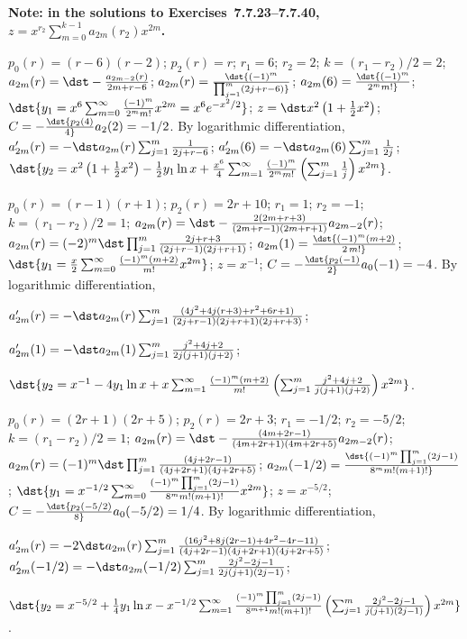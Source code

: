 \documentclass[dvips]{book}
\renewcommand{\exer}[1]{\par\medskip\;\noindent{\color{red}\bf #1.}}
\numberwithin{example}{section}
\numberwithin{equation}{section}
\numberwithin{theorem}{section}
\numberwithin{table}{section}
\numberwithin{figure}{section}
\begin{document}
{\bf Note: in the solutions to Exercises~7.7.23--7.7.40,
$z=x^{r_2}\sum_{m=0}^{k-1}a_{2m}(r_2)x^{2m}$.}




\exer{7.7.24}
$p_0(r)=(r-6)(r-2)$;
$p_2(r)=r$;
$r_1=6$; $r_2=2$; $k=(r_1-r_2)/2=2$;
$a_{2m}(r)=\dst-{a_{2m-2}(r)\over2m+r-6}
$;
 $a_{2m}(r)=\dst{(-1)^m\over\prod_{j=1}^m(2j+r-6)}$;
$a_{2m}(6)=\dst{(-1)^m\over2^mm!}$;
$\dst{y_1=x^6\sum_{m=0}^\infty{(-1)^m\over2^mm!}x^{2m}=x^6e^{-x^2/2}}$;
$z=\dst x^2\left(1+{1\over2}x^2\right)$;
$C=-\dst{p_2(4)\over4}a_2(2)=-1/2$.
By logarithmic differentiation,
$a_{2m}'(r)=-\dst a_{2m}(r)\sum_{j=1}^m{1\over2j+r-6}$;
$a_{2m}'(6)=-\dst a_{2m}(6)\sum_{j=1}^m{1\over2j}$;
$\dst{y_2=x^2\left(1+{1\over2}x^2\right)-{1\over2}y_1\ln
x+{x^6\over4}\sum_{m=1}^\infty{(-1)^m\over2^mm!}\left(\sum_{j=1}^m
{1\over j}\right)x^{2m}}$.


\exer{7.7.26}
$p_0(r)=(r-1)(r+1)$;
$p_2(r)=2r+10$;
$r_1=1$; $r_2=-1$; $k=(r_1-r_2)/2=1$;
$a_{2m}(r)=\dst-{2(2m+r+3)\over(2m+r-1)(2m+r+1)}a_{2m-2}(r)$;
 $a_{2m}(r)=(-2)^m\dst\prod_{j=1}^m{2j+r+3\over(2j+r-1)(2j+r+1)}$;
$a_{2m}(1)=\dst{(-1)^m(m+2)\over2\, m!}$;
$\dst{y_1={x\over2}\sum_{m=0}^\infty{(-1)^m(m+2)\over m!}x^{2m}}$;
$z=x^{-1}$;
$C=-\dst{p_2(-1)\over 2}a_0(-1)=-4$.
By logarithmic differentiation,

$a_{2m}'(r)=-\dst a_{2m}(r)\sum_{j=1}^m
{(4j^2+4j(r+3)+r^2+6r+1)\over(2j+r-1)(2j+r+1)(2j+r+3)}$;

$a_{2m}'(1)=-\dst a_{2m}(1)\sum_{j=1}^m{j^2+4j+2\over2j(j+1)(j+2)}$;

$\dst{y_2=x^{-1}-4y_1\ln x+x\sum_{m=1}^\infty{(-1)^m(m+2)\over
m!}\left(\sum_{j=1}^m{j^2+4j+2\over j(j+1)(j+2)} \right)x^{2m}}$.




\exer{7.7.28}
$p_0(r)=(2r+1)(2r+5)$;
$p_2(r)=2r+3$;
$r_1=-1/2$; $r_2=-5/2$; $k=(r_1-r_2)/2=1$;
$a_{2m}(r)=\dst-{(4m+2r-1)\over(4m+2r+1)(4m+2r+5)}a_{2m-2}(r)$;
$a_{2m}(r)=(-1)^m\dst\prod_{j=1}^m{(4j+2r-1)\over(4j+2r+1)(4j+2r+5)}$;
$a_{2m}(-1/2)=\dst{(-1)^m\prod_{j=1}^m(2j-1)\over8^mm!(m+1)!}$;
$\dst{y_1=x^{-1/2}\sum_{m=0}^\infty
{(-1)^m\prod_{j=1}^m(2j-1)\over8^mm!(m+1)!}
x^{2m}}$;
$z=x^{-5/2}$;
$C=-\dst{p_2(-5/2)\over8}a_0(-5/2)=1/4$.
By logarithmic differentiation,

$a_{2m}'(r)=-2\dst a_{2m}(r)\sum_{j=1}^m
{(16j^2+8j(2r-1)+4r^2-4r-11)\over(4j+2r-1)(4j+2r+1)(4j+2r+5)}$;
$a_{2m}'(-1/2)=-\dst a_{2m}(-1/2)\sum_{j=1}^m{2j^2-2j-1\over
2j(j+1)(2j-1)}$;

$\dst{y_2=x^{-5/2}+{1\over4}y_1\ln x
-x^{-1/2}\sum_{m=1}^\infty{(-1)^m\prod_{j=1}^m(2j-1)\over8^{m+1}m!(m+1)!}
\left(\sum_{j=1}^m{2j^2-2j-1\over j(j+1)(2j-1)}\right) x^{2m}}$.
\end{document}
